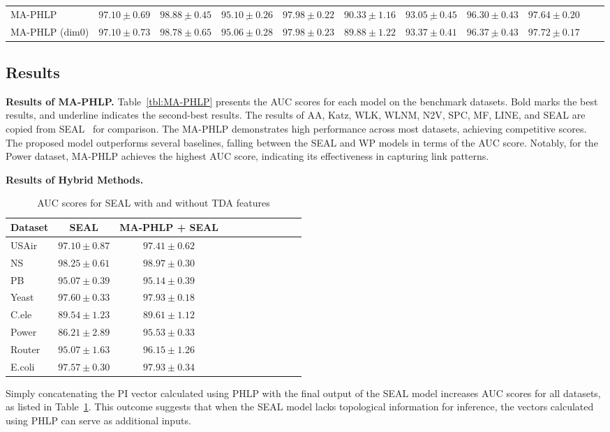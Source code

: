 \begin{table*}
{\begin{tabular}{l|cccccccccc}
\midrule
MA-PHLP & $\underline{ 97.10 \pm 0.69 }$ & $\underline{98.88\pm0.45}$ & $\underline{95.10\pm0.26}$ & $\underline{97.98\pm0.22}$ & $\underline{90.33\pm1.16}$ & $\underline{93.05\pm0.45}$ & $96.30\pm0.43$ & $97.64\pm0.20$  \\
MA-PHLP (dim$0$) & $97.10\pm0.73$ & $98.78\pm0.65$ & $95.06\pm0.28$ & $97.98\pm0.23$ & $89.88\pm1.22$ & $\mathbf{93.37} \pm\mathbf{0.41}$ & $\underline{96.37\pm0.43}$ & $\underline{97.72\pm0.17}$  \\
\bottomrule
\end{tabular}}
\label{tbl:MA-PHLP}
\end{table*}

\subsection{Results}
\noindent\textbf{Results of MA-PHLP.}
Table~\ref{tbl:MA-PHLP} presents the AUC scores for each model on the benchmark datasets. 
Bold marks the best results, and underline indicates the second-best results.
The results of AA, Katz, WLK, WLNM, N2V, SPC, MF, LINE, and SEAL are copied from SEAL~\cite{zhang2018link} for comparison. 
The MA-PHLP demonstrates high performance across most datasets, achieving competitive scores.
The proposed model outperforms several baselines, falling between the SEAL and WP models in terms of the AUC score. 
Notably, for the Power dataset, MA-PHLP achieves the highest AUC score, indicating its effectiveness in capturing link patterns.

\noindent\textbf{Results of Hybrid Methods.}
\begin{table}[ht!]
\centering
\caption{AUC scores for SEAL with and without TDA features}
\begin{tabular}{l|cccccccccc}
\toprule
Dataset & SEAL & MA-PHLP + SEAL \\
\midrule
USAir & $97.10 \pm 0.87$ & $\mathbf{97.41} \pm \mathbf{0.62}$ \\
NS & $98.25 \pm 0.61$ & $\mathbf{98.97} \pm \mathbf{0.30}$ \\
PB & $95.07\pm0.39$ & $\mathbf{95.14} \pm \mathbf{0.39}$ \\
Yeast & $97.60\pm0.33$ & $\mathbf{97.93} \pm \mathbf{0.18}$ \\
C.ele & $89.54 \pm 1.23$ & $\mathbf{89.61} \pm \mathbf{1.12}$ \\
Power & $86.21 \pm 2.89$ & $\mathbf{95.53} \pm \mathbf{0.33}$ \\
Router & $95.07 \pm 1.63$ & $\mathbf{96.15} \pm \mathbf{1.26}$ \\
E.coli & $97.57\pm0.30$ & $\mathbf{97.93}\pm\mathbf{0.34}$ \\
\bottomrule
\end{tabular}\label{tbl:PHLP+SEAL}
\end{table}
Simply concatenating the PI vector calculated using PHLP with the final output of the SEAL model increases AUC scores for all datasets, as listed in Table~\ref{tbl:PHLP+SEAL}. This outcome suggests that when the SEAL model lacks topological information for inference, 
the vectors calculated using PHLP can serve as additional inputs.

